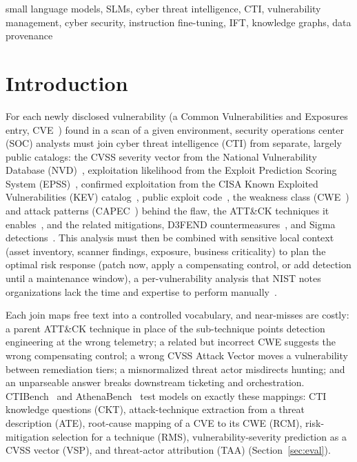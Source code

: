 \documentclass[conference]{IEEEtran}
\begin{document}
\begin{IEEEkeywords}
small language models, SLMs, cyber threat intelligence, CTI, vulnerability management, cyber security, instruction fine-tuning, IFT, knowledge graphs, data provenance
\end{IEEEkeywords}

\section{Introduction}
For each newly disclosed vulnerability (a Common Vulnerabilities and Exposures entry, CVE~\cite{cve}) found in a scan of a given environment, security operations center (SOC) analysts must join cyber threat intelligence (CTI) from separate, largely public catalogs: the CVSS severity vector from the National Vulnerability Database (NVD)~\cite{nvd}, exploitation likelihood from the Exploit Prediction Scoring System (EPSS)~\cite{jacobs2021epss}, confirmed exploitation from the CISA Known Exploited Vulnerabilities (KEV) catalog~\cite{cisakev}, public exploit code~\cite{exploitdb,pocingithub}, the weakness class (CWE~\cite{cwe}) and attack patterns (CAPEC~\cite{capec}) behind the flaw, the ATT\&CK techniques it enables~\cite{strom2018attack}, and the related mitigations, D3FEND countermeasures~\cite{d3fend}, and Sigma detections~\cite{sigma}. This analysis must then be combined with sensitive local context (asset inventory, scanner findings, exposure, business criticality) to plan the optimal risk response (patch now, apply a compensating control, or add detection until a maintenance window), a per-vulnerability analysis that NIST notes organizations lack the time and expertise to perform manually~\cite{nist80040r4}.

Each join maps free text into a controlled vocabulary, and near-misses are costly: a parent ATT\&CK technique in place of the sub-technique points detection engineering at the wrong telemetry; a related but incorrect CWE suggests the wrong compensating control; a wrong CVSS Attack Vector moves a vulnerability between remediation tiers; a misnormalized threat actor misdirects hunting; and an unparseable answer breaks downstream ticketing and orchestration. CTIBench~\cite{ctibench} and AthenaBench~\cite{athenabench} test models on exactly these mappings: CTI knowledge questions (CKT), attack-technique extraction from a threat description (ATE), root-cause mapping of a CVE to its CWE (RCM), risk-mitigation selection for a technique (RMS), vulnerability-severity prediction as a CVSS vector (VSP), and threat-actor attribution (TAA) (Section~\ref{sec:eval}).
\end{document}
